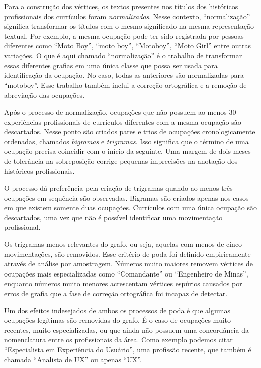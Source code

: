 \documentclass[12pt,a4paper]{article}
\begin{document}
Para a construção dos vértices, os textos presentes nos títulos dos históricos profissionais dos currículos foram \textit{normalizados}. Nesse contexto, \enquote{normalização} significa transformar os títulos com o mesmo significado na mesma representação textual. Por exemplo, a mesma ocupação pode ter sido registrada por pessoas diferentes como \enquote{Moto Boy}, \enquote{moto boy}, \enquote{Motoboy}, \enquote{Moto Girl} entre outras variações. O que é aqui chamado \enquote{normalização} é o trabalho de transformar essas diferentes grafias em uma única classe que possa ser usada para identificação da ocupação. No caso, todas as anteriores são normalizadas para \enquote{motoboy}. Esse trabalho também inclui a correção ortográfica e a remoção de abreviação das ocupações.

Após o processo de normalização, ocupações que não possuem ao menos 30 experiências profissionais de currículos diferentes com a mesma ocupação são descartados. Nesse ponto são criados pares e trios de ocupações cronologicamente ordenadas, chamados \textit{bigramas} e \textit{trigramas}. Isso significa que o término de uma ocupação precisa coincidir com o início da seguinte. Uma margem de dois meses de tolerância na sobreposição corrige pequenas imprecisões na anotação dos históricos profissionais. 

O processo dá preferência pela criação de trigramas quando ao menos três ocupações em sequência são observadas. Bigramas são criados apenas nos casos em que existem somente duas ocupações. Currículos com uma única ocupação são descartados, uma vez que não é possível identificar uma movimentação profissional.

Os trigramas menos relevantes do grafo, ou seja, aquelas com menos de cinco movimentações, são removidos. Esse critério de poda foi definido empiricamente através de análise por amostragem. Números muito maiores removem vértices de ocupações mais especializadas como \enquote{Comandante} ou \enquote{Engenheiro de Minas}, enquanto números muito menores acrescentam vértices espúrios causados por erros de grafia que a fase de correção ortográfica foi incapaz de detectar.

Um dos efeitos indesejados de ambos os processos de poda é que algumas ocupações legítimas são removidas do grafo. É o caso de ocupações muito recentes, muito especializadas, ou que ainda não possuem uma concordância da nomenclatura entre os profissionais da área. Como exemplo podemos citar \enquote{Especialista em Experiência do Usuário}, uma profissão recente, que também é chamada \enquote{Analista de UX} ou apenas \enquote{UX}.
\end{document}
